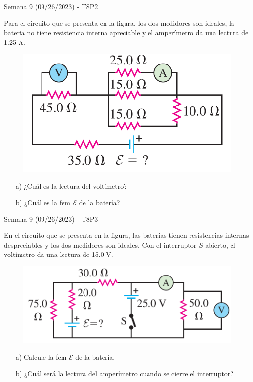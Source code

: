 \begin{frame}{Semana 9 (09/26/2023) - T8P2}

Para el circuito que se presenta en la figura, los dos medidores son ideales, la batería no tiene resistencia interna apreciable y el
amperímetro da una lectura de 1.25 A.

\begin{figure}
    \centering
    \includegraphics[scale=0.2]{figures/t8p22302.png}
\end{figure}

\begin{itemize}
    \item[a)] ¿Cuál es la lectura del voltímetro?
    \item[b)] ¿Cuál es la fem $\mathcal{E}$ de la batería?
    
\end{itemize}
    
\end{frame}

\begin{frame}{Semana 9 (09/26/2023) - T8P3}
    
    En el circuito que se presenta en la figura, las baterías tienen resistencias internas despreciables y los dos medidores son ideales. Con el interruptor $S$ abierto, el voltímetro da una lectura de 15.0 V.
    
    \begin{figure}
    \centering
    \includegraphics[scale=0.2]{figures/t8p32302.png}
    \end{figure}
    
    \begin{itemize}
        \item[a)] Calcule la fem $\mathcal{E}$ de la batería.
        \item[b)] ¿Cuál será la lectura del amperímetro cuando se cierre el interruptor?
    \end{itemize}
    
\end{frame}

